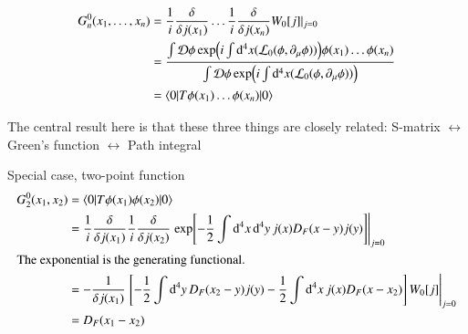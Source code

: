 \begin{align}
   G_n^0 (x_1,\dots, x_n) &= \frac{1}{i} \frac{\delta}{ \delta j(x_1)} \dots \frac{1}{i} \frac{\delta}{ \delta j(x_n)} W_0[j] |_{j=0} \notag \\
                          &= \frac{\int \mathcal{D} \phi \exp(i\int \dd^4 x (\mathcal{L}_0(\phi, \partial_\mu \phi)) )\phi(x_1) \dots \phi(x_n) }{\int \mathcal{D} \phi \exp(i\int \dd^4 x (\mathcal{L}_0(\phi, \partial_\mu \phi)))} \notag \\
                          &= \braket{0 | T \phi(x_1) \dots \phi(x_n) | 0}
\end{align}

The central result here is that these three things are closely related: S-matrix $\leftrightarrow$ Green's function $\leftrightarrow$ Path integral



Special case, two-point function
\begin{align*}
   G_2^0 (x_1, x_2) &= \braket{0 | T \phi(x_1) \phi(x_2) | 0}  \\
                    &= \frac{1}{i} \frac{\delta}{\delta j(x_1)} \frac{1}{i} \frac{\delta}{\delta j(x_2)} \eval{\exp[-\frac{1}{2} \int \dd[4]{x} \dd[4]{y} j(x) D_F(x-y) j(y) ]}_{j=0} \\
                    \shortintertext{The exponential is the generating functional.}
                    &= -\frac{1}{\delta j(x_1)} \eval{\left[ -\frac{1}{2} \int \dd[4]{y} D_F(x_2 - y) j(y) - \frac{1}{2} \int \dd[4]{x} j(x) D_F(x-x_2) \right]W_0[j]}_{j=0} \\
                    &= D_F(x_1 - x_2)
\end{align*}

